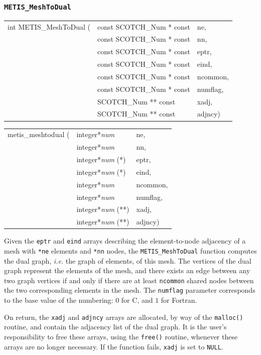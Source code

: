 \subsubsection{{\tt METIS\_MeshToDual}}

\begin{itemize}
\progsyn

{\tt\begin{tabular}{l@{}ll}
int METIS\_MeshToDual ( & const SCOTCH\_Num * const & ne,      \\
                        & const SCOTCH\_Num * const & nn,      \\
                        & const SCOTCH\_Num * const & eptr,    \\
                        & const SCOTCH\_Num * const & eind,    \\
                        & const SCOTCH\_Num * const & ncommon, \\
                        & const SCOTCH\_Num * const & numflag, \\
                        & SCOTCH\_Num ** const      & xadj,    \\
                        & SCOTCH\_Num ** const      & adjncy)
\end{tabular}}

{\tt\begin{tabular}{l@{}ll}
metis\_meshtodual ( & integer*{\it num}      & ne,      \\
                    & integer*{\it num}      & nn,      \\
                    & integer*{\it num} (*)  & eptr,    \\
                    & integer*{\it num} (*)  & eind,    \\
                    & integer*{\it num}      & ncommon, \\
                    & integer*{\it num}      & numflag, \\
                    & integer*{\it num} (**) & xadj,    \\
                    & integer*{\it num} (**) & adjncy)
\end{tabular}}

\progdes

Given the \texttt{eptr} and \texttt{eind} arrays describing the
element-to-node adjacency of a mesh with \texttt{*ne} elements and
\texttt{*nn} nodes, the \texttt{METIS\_MeshToDual} function computes
the dual graph, {\it i.e. } the graph of elements, of this mesh. The
vertices of the dual graph represent the elements of the mesh, and
there exists an edge between any two graph vertices if and only if
there are at least \texttt{ncommon} shared nodes between the two
corresponding elements in the mesh. The \texttt{numflag} parameter
corresponds to the base value of the numbering: $0$ for C, and $1$ for
Fortran.

On return, the \texttt{xadj} and \texttt{adjncy} arrays are allocated,
by way of the \texttt{malloc()} routine, and contain the adjacency
list of the dual graph. It is the user's responsibility to free these
arrays, using the \texttt{free()} routine, whenever these arrays are
no longer necessary. If the function fails, \texttt{xadj} is set to
\texttt{NULL}.
\end{itemize}

